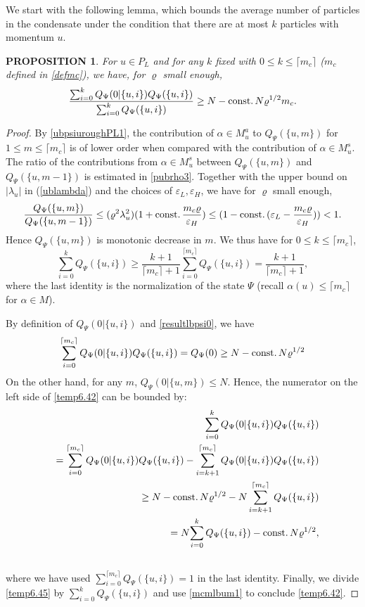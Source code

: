 \documentclass[11pt]{article}
\numberwithin{equation}{section}
\newcommand{\beq}{\begin{equation}}
\newcommand{\eeq}{\end{equation}}
\newcommand{\beqa}{\begin{eqnarray}}
\newcommand{\eeqa}{\end{eqnarray}}
\newcommand\eps{\varepsilon}
\newcommand\const{{\rm const.\, }}
\newcommand\al{{\alpha}}
\renewcommand\rho\varrho
\newtheorem{prop}{PROPOSITION}[section]
\theoremstyle{definition}
\begin{document}
 We start with the following lemma, which  bounds the average number of particles in the condensate under the condition that there are at most $k$ particles with momentum $u$. 
\begin{prop}\label{prop6} For $u \in P_{L}$ and for any $k$ fixed with $0\leq k\leq \lceil m_c\rceil$ ($m_{c}$ defined in \eqref{defmc}),
we have, for $\rho$ small enough,
\beqa\label{temp6.42}
\frac{\sum_{i=0}^kQ_\Psi(0 | \{u,i\}) Q_\Psi(\{u,i\})}{\sum_{i=0}^k Q_\Psi(\{u,i\})}\geq N-\const N\rho^{1/2}m_c .
\eeqa
\end{prop}


\begin{proof}  By \eqref{ubpsiuroughPL1},  the contribution of $\alpha \in M^a_u$ to $Q_\Psi(\{u,m\})$ for  $1\leq m\leq \lceil m_c\rceil$
is of lower order when compared with the contribution of $\alpha \in M^s_u$. The ratio of the contributions from $\alpha \in M^s_u$
between  $Q_\Psi(\{u,m\}) $ and $ Q_\Psi(\{u,m-1\})$ is estimated in \eqref{pubrho3}. Together with  the upper bound on  
$|\lambda_u|$ in (\ref{ublambda}) and the choices of  $\eps_L, \eps_H$, we have for $\rho$ small enough, 
\beq\label{mcmlbum0}
\frac{ Q_\Psi(\{u,m\})}{ Q_\Psi(\{u,m-1\})}\leq (\rho^2\lambda_u^2)(1+\const \frac{m_c\rho}{ \eps_H})\leq (1-\const (\eps_L- \frac{m_c\rho}{ \eps_H}))< 1.
\eeq
Hence $Q_\Psi(\{u,m\}) $ is monotonic decrease in $m$.  We thus  have for $0\leq k\leq \lceil m_c\rceil$,
\beq\label{mcmlbum1}
\sum_{i=0}^{k}Q_\Psi(\{u,i\})
\ge \frac{k+1}{\lceil m_c\rceil+1} \sum_{i=0}^{\lceil m_c\rceil}Q_\Psi(\{u,i\})  =  \frac{k+1}{\lceil m_c\rceil+1},
\eeq
where the last identity is the normalization of the state $\Psi$ (recall $\al(u)\leq\lceil m_c\rceil$ for $\al\in M$).

By definition of  $Q_\Psi(0 | \{u,i\})$ and \eqref{resultlbpsi0}, we have
$$
\sum_{i=0}^{\lceil m_c\rceil}Q_\Psi(0|\{u,i\}) Q_\Psi(\{u,i\})=
Q_\Psi(0)\geq N-\const N\rho^{1/2}
$$
On the other hand, for any $m$, $Q_\Psi(0|\{u,m\})\leq N$. Hence, the numerator 
on the left side of  \eqref{temp6.42} can be bounded by:
\beqa\nonumber
   &&  \sum_{i=0}^kQ_\Psi(0 | \{u,i\}) Q_\Psi(\{u,i\}) \\\nonumber
    && = \sum_{i=0}^{\lceil m_c\rceil}Q_\Psi(0| \{u,i\}) Q_\Psi(\{u,i\})-\sum_{i=k+1}^{\lceil m_c\rceil}Q_\Psi(0 | \{u,i\}) Q_\Psi(\{u,i\})\\\label{temp6.45}
 && \geq N-\const N\rho^{1/2}-N\sum_{i=k+1}^{\lceil m_c\rceil}   Q_\Psi(\{u,i\}) \\\nonumber
&&  =N{\sum_{i=0}^{k} Q_\Psi(\{u,i\})}-\const N\rho^{1/2}, \\\nonumber
\eeqa
where we have used  $\sum_{i=0}^{\lceil m_c\rceil} Q_\Psi(\{u,i\})=1$ in the last identity.
Finally, we  divide \eqref{temp6.45} by $\sum_{i=0}^{k} Q_\Psi(\{u,i\})$ and use  \eqref{mcmlbum1} to conclude 
\eqref{temp6.42}. 
\end{proof}
\end{document}
